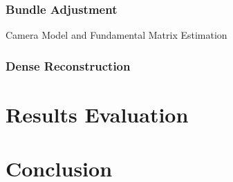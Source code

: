 \subsection*{Bundle Adjustment}
Camera Model and Fundamental Matrix Estimation
\subsection*{Dense Reconstruction}

\chapter{Results Evaluation}
\label{chapter:results_evaluation}

\chapter{Conclusion}
\label{chapter:conclusion}


